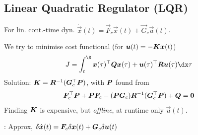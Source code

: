 \subsection{Linear Quadratic Regulator (LQR)}
For lin. cont.-time dyn. $\dot{\vec{x}}(t) = \vec{F}_c \vec{x}(t) + \vec{G}_c \vec{u}(t)$.

We try to minimise cost functional (for $\bm{u}(t) = -\bm{K}\bm{x}(t)$)
\[
    J = \int_{t}^{\8} \vec{x}(\tau)^\top \vec{Q}\vec{x}(\tau) + \vec{u}(\tau)^\top \vec{R} \vec{u}(\tau) \dx \tau
\]
Solution: $\bm{K} = \bm{R}^{-1} (\bm{G}_c^\top \bm{P})$, with $\bm{P}$ found from
\[
    \bm{F}_c^\top \bm{P} + \bm{PF}_c - (\bm{PG}_c) \bm{R}^{-1} (\bm{G}_c^\top \bm{P}) + \bm{Q} = \bm{0}
\]
Finding $\bm{K}$ is expensive, but \textit{offline}, at runtime only $\vec{u}(t)$.

: Approx, $\delta\dot{\bm{x}}(t) = \bm{F}_c \delta \bm{x}(t) + \bm{G}_c \delta \bm{u}(t)$
